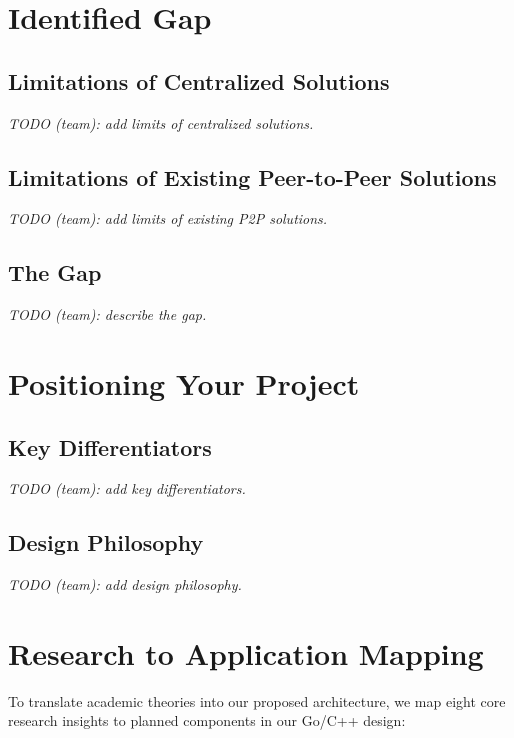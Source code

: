 \documentclass[11pt,oneside]{article}
\begin{document}
\section{Identified Gap}

\subsection{Limitations of Centralized Solutions}
\textit{TODO (team): add limits of centralized solutions.}

\subsection{Limitations of Existing Peer-to-Peer Solutions}
\textit{TODO (team): add limits of existing P2P solutions.}

\subsection{The Gap}
\textit{TODO (team): describe the gap.}

\section{Positioning Your Project}

\subsection{Key Differentiators}
\textit{TODO (team): add key differentiators.}

\subsection{Design Philosophy}
\textit{TODO (team): add design philosophy.}

\section{Research to Application Mapping}

To translate academic theories into our proposed architecture, we map eight core research insights to planned components in our Go/C++ design:
\end{document}
